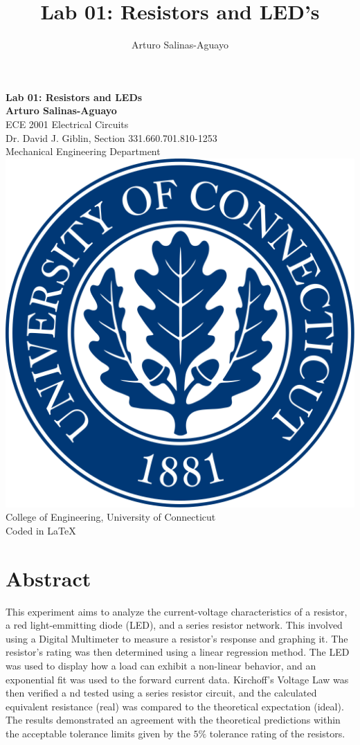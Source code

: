 \documentclass[12pt]{article}
\author{Arturo Salinas-Aguayo}
\title{Lab 01: Resistors and LED's}
\begin{document}
\newcommand{\closure}[2][3]{%
	{}\mkern#1mu\overline{\mkern-#1mu#2}}
\newcommand\ncoverline[1]{\mkern1mu\overline{\mkern-1mu#1\mkern-1mu}\mkern1mu}
\begin{titlepage}
	\centering
	\vspace*{3cm}
	\huge\textbf{Lab 01: Resistors and LEDs}\\
	\vspace{5cm}
	\Large\textbf{Arturo Salinas-Aguayo}\\
	\normalsize
	ECE 2001 Electrical Circuits\\
	Dr. David J. Giblin, Section 331.660.701.810-1253\\
	Mechanical Engineering Department
	\vfill
	\includegraphics[scale=0.1]{uconnlogo}\\
	College of Engineering, University of Connecticut\\
	\scriptsize{Coded in \LaTeX}
	\vspace*{1cm}
\end{titlepage}
\tableofcontents
\newpage
\section{Abstract}
This experiment aims to analyze the current-voltage characteristics of a
resistor, a red light-emmitting diode (LED), and a series resistor network.
This involved using a Digital Multimeter to measure a resistor's response and
graphing it. The resistor's rating was then determined using a linear regression
method. The LED was used to display how a load can exhibit a non-linear
behavior, and an exponential fit was used to the forward current data.
Kirchoff's Voltage Law was then verified a nd tested using a series resistor
circuit, and the calculated equivalent resistance (real) was compared to the
theoretical expectation (ideal). The results demonstrated an agreement with the
theoretical predictions within the acceptable tolerance limits given by the
\(5\%\) tolerance
rating of the resistors.
\newpage
\end{document}
